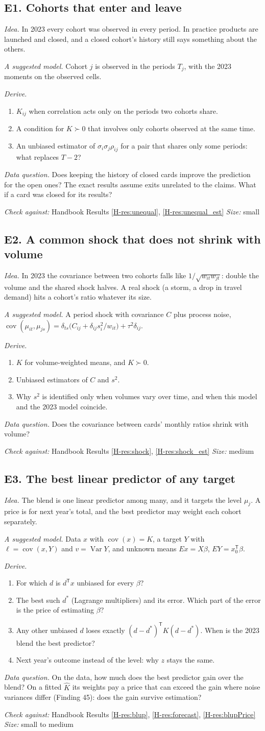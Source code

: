 \documentclass[10pt]{article}
\newcommand{\hb}[1]{\ref*{H-#1}}
\newcommand{\cov}{\operatorname{cov}}
\newcommand{\Var}{\operatorname{Var}}
\newcommand{\ext}[7]{%
  \subsection*{#1}
  \textit{Idea.} #2\par\smallskip
  \textit{A suggested model.} #3\par\smallskip
  \textit{Derive.}
  \begin{enumerate}\setlength{\itemsep}{1pt}\setlength{\parskip}{0pt}#4\end{enumerate}
  \textit{Data question.} #5\par\smallskip
  {\small\textit{Check against:} Handbook #6 \quad\textperiodcentered\quad \textit{Size:} #7}\par}
\begin{document}
\ext{E1. Cohorts that enter and leave}
{In 2023 every cohort was observed in every period. In practice products are launched and closed,
and a closed cohort's history still says something about the others.}
{Cohort $j$ is observed in the periods $T_j$, with the 2023 moments on the observed cells.}
{\item $K_{ij}$ when correlation acts only on the periods two cohorts share.
 \item A condition for $K \succ 0$ that involves only cohorts observed at the same time.
 \item An unbiased estimator of $\sigma_i\sigma_j\rho_{ij}$ for a pair that shares only some
   periods: what replaces $T - 2$?}
{Does keeping the history of closed cards improve the prediction for the open ones? The exact
results assume exits unrelated to the claims. What if a card was closed for its results?}
{Results \hb{res:unequal}, \hb{res:unequal_est}}{small}

\ext{E2. A common shock that does not shrink with volume}
{In 2023 the covariance between two cohorts falls like $1/\sqrt{w_{it}w_{jt}}$: double the volume
and the shared shock halves. A real shock (a storm, a drop in travel demand) hits a cohort's ratio
whatever its size.}
{A period shock with covariance $C$ plus process noise,
 $\cov(\mu_{it}, \mu_{js}) = \delta_{ts}\bigl(C_{ij} + \delta_{ij}s_i^2/w_{it}\bigr) + \tau^2\delta_{ij}$.}
{\item $K$ for volume-weighted means, and $K \succ 0$.
 \item Unbiased estimators of $C$ and $s^2$.
 \item Why $s^2$ is identified only when volumes vary over time, and when this model and the 2023
   model coincide.}
{Does the covariance between cards' monthly ratios shrink with volume?}
{Results \hb{res:shock}, \hb{res:shock_est}}{medium}

\ext{E3. The best linear predictor of any target}
{The blend is one linear predictor among many, and it targets the level $\mu_j$. A price is for
next year's total, and the best predictor may weight each cohort separately.}
{Data $x$ with $\cov(x) = K$, a target $Y$ with $\ell = \cov(x, Y)$ and $v = \Var Y$, and unknown
means $Ex = X\beta$, $EY = x_0^{\mathsf T}\beta$.}
{\item For which $d$ is $d^{\mathsf T}x$ unbiased for every $\beta$?
 \item The best such $d^*$ (Lagrange multipliers) and its error. Which part of the error is the
   price of estimating $\beta$?
 \item Any other unbiased $d$ loses exactly $(d - d^*)^{\mathsf T}K(d - d^*)$. When is the 2023
   blend the best predictor?
 \item Next year's outcome instead of the level: why $z$ stays the same.}
{On the data, how much does the best predictor gain over the blend? On a fitted $\hat K$ its
weights pay a price that can exceed the gain where noise variances differ (Finding 45): does the
gain survive estimation?}
{Results \hb{res:blup}, \hb{res:forecast}, \hb{res:blupPrice}}{small to medium}
\end{document}
